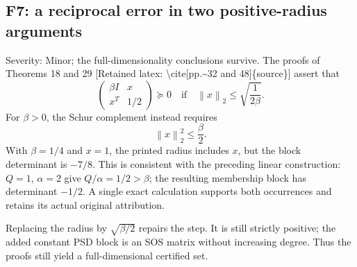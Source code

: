 \documentclass[10pt]{article}
\begin{document}
\subsection*{F7: a reciprocal error in two positive-radius arguments}
Severity: Minor; the full-dimensionality conclusions survive. The proofs of Theorems 18 and 29 [Retained latex: \textbackslash{}cite[pp.\textasciitilde{}32 and 48]\{source\}] assert that \[\begin{pmatrix}\beta I&x\\x^T&1/2\end{pmatrix}\succeq0
 \quad\text{if}\quad \left\lVert x\right\rVert_2\le\sqrt{\frac1{2\beta}}.\] For \(\beta>0\), the Schur complement instead requires \[\left\lVert x\right\rVert_2^2\le\frac{\beta}{2}.\] With \(\beta=1/4\) and \(x=1\), the printed radius includes \(x\), but the block determinant is \(-7/8\). This is consistent with the preceding linear construction: \(Q=1\), \(\alpha=2\) give \(Q/\alpha=1/2>\beta\); the resulting membership block has determinant \(-1/2\). A single exact calculation supports both occurrences and retains its actual original attribution.\par
Replacing the radius by \(\sqrt{\beta/2}\) repairs the step. It is still strictly positive; the added constant PSD block is an SOS matrix without increasing degree. Thus the proofs still yield a full-dimensional certified set.\par
\end{document}
